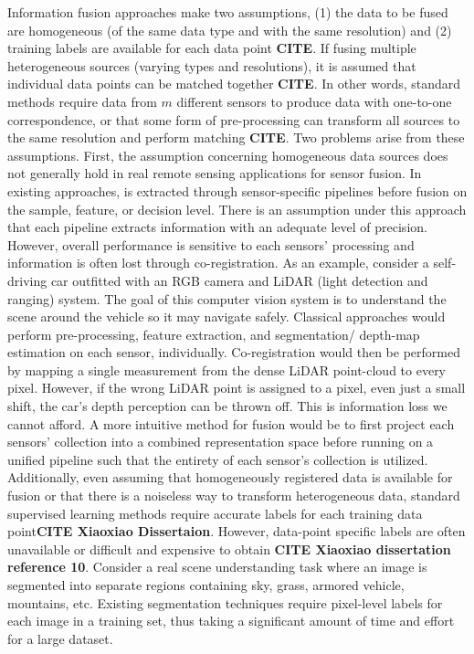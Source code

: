 Information fusion approaches make two assumptions, (1) the data to be fused are homogeneous (of the same data type and with the same resolution) and (2) training labels are available for each data point \textbf{CITE}.  If fusing multiple heterogeneous sources (varying types and resolutions), it is assumed that individual data points can be matched together \textbf{CITE}.  In other words, standard methods require data from $m$ different sensors to produce data with one-to-one correspondence, or that some form of pre-processing can transform all sources to the same resolution and perform matching \textbf{CITE}. 
\newline
Two problems arise from these assumptions.  First, the assumption concerning homogeneous data sources does not generally hold in real remote sensing applications for sensor fusion.  In existing approaches, is extracted through sensor-specific pipelines before fusion on the sample, feature, or decision level.  There is an assumption under this approach that each pipeline extracts information with an adequate level of precision.  However, overall performance is sensitive to each sensors' processing and information is often lost through co-registration.  As an example, consider a self-driving car outfitted with an RGB camera and LiDAR (light detection and ranging) system. The goal of this computer vision system is to understand the scene around the vehicle so it may navigate safely.  Classical approaches would perform pre-processing, feature extraction, and segmentation/ depth-map estimation on each sensor, individually.  Co-registration would then be performed by mapping a single measurement from the dense LiDAR point-cloud to every pixel.  However, if the wrong LiDAR point is assigned to a pixel, even just a small shift, the car's depth perception can be thrown off.  This is information loss we cannot afford.  A more intuitive method for fusion would be to first project each sensors' collection into a combined representation space before running on a unified pipeline such that the entirety of each sensor's collection is utilized. 
\newline
Additionally, even assuming that homogeneously registered data is available for fusion or that there is a noiseless way to transform heterogeneous  data, standard supervised learning methods require accurate labels for each training data point\textbf{CITE Xiaoxiao Dissertaion}.  However, data-point specific labels are often unavailable or difficult and expensive to obtain \textbf{CITE Xiaoxiao dissertation reference 10}. Consider a real scene understanding task where an image is segmented into separate regions containing sky, grass, armored vehicle, mountains, etc.  Existing segmentation techniques require pixel-level labels for each image in a training set, thus taking a significant amount of time and effort for a large dataset.
